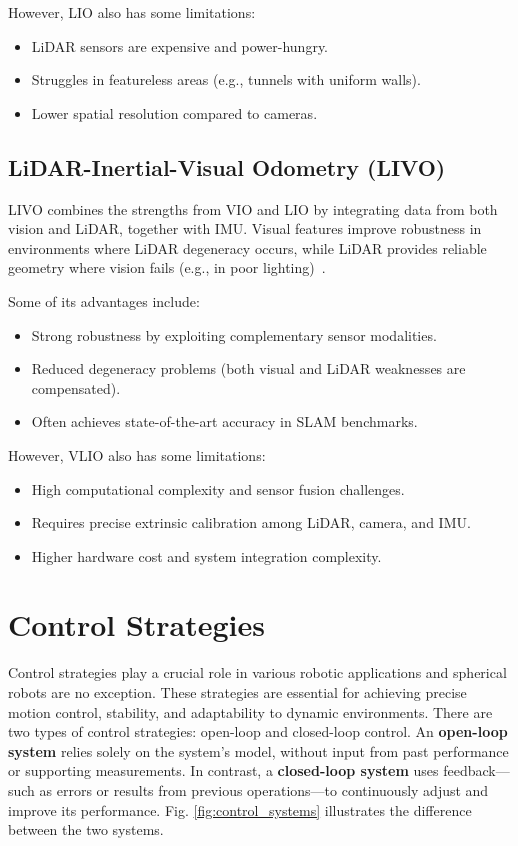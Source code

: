 \documentclass[english, bachelor, utf8]{base/thesis_telematics}
\begin{document}
However, LIO also has some limitations:
\begin{itemize}
    \item LiDAR sensors are expensive and power-hungry.
    \item Struggles in featureless areas (e.g., tunnels with uniform walls).
    \item Lower spatial resolution compared to cameras.
\end{itemize}

\subsection{LiDAR-Inertial-Visual Odometry (LIVO)}
LIVO combines the strengths from VIO and LIO by integrating data from both vision and LiDAR, together with IMU.
Visual features improve robustness in environments where LiDAR degeneracy occurs, while LiDAR provides reliable geometry where vision fails (e.g., in poor lighting)~\cite{yuan2024sr,fastlivo2}.

Some of its advantages include:
\begin{itemize}
    \item Strong robustness by exploiting complementary sensor modalities.
    \item Reduced degeneracy problems (both visual and LiDAR weaknesses are compensated).
    \item Often achieves state-of-the-art accuracy in SLAM benchmarks.
\end{itemize}

However, VLIO also has some limitations:
\begin{itemize}
    \item High computational complexity and sensor fusion challenges.
    \item Requires precise extrinsic calibration among LiDAR, camera, and IMU.
    \item Higher hardware cost and system integration complexity.
\end{itemize}

\section{Control Strategies}
\label{sec:control-strategies}
Control strategies play a crucial role in various robotic applications and spherical robots are no exception.
These strategies are essential for achieving precise motion control, stability, and adaptability to dynamic environments.
There are two types of control strategies: open-loop and closed-loop control.
An \textbf{open-loop system} relies solely on the system's model, without input from past performance or supporting measurements. In contrast, a \textbf{closed-loop system} uses feedback---such as errors or results from previous operations---to continuously adjust and improve its performance. Fig. \ref{fig:control_systems} illustrates the difference between the two systems.\cite{feedbackBook,vectornav_math_controls}
\end{document}
